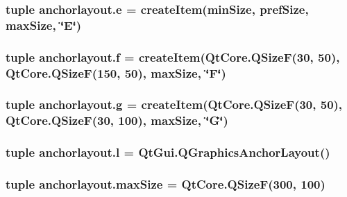 \subsubsection[{e}]{\setlength{\rightskip}{0pt plus 5cm}tuple anchorlayout.\+e = {\bf create\+Item}({\bf min\+Size}, {\bf pref\+Size}, {\bf max\+Size}, \char`\"{}E\char`\"{})}\label{namespaceanchorlayout_afef44353655532b8178bdd762c271458}
\hypertarget{namespaceanchorlayout_a8be1f6f388d4e72f30b16dc5140b952a}{}
\subsubsection[{f}]{\setlength{\rightskip}{0pt plus 5cm}tuple anchorlayout.\+f = {\bf create\+Item}(Qt\+Core.\+Q\+Size\+F(30, 50), Qt\+Core.\+Q\+Size\+F(150, 50), {\bf max\+Size}, \char`\"{}F\char`\"{})}\label{namespaceanchorlayout_a8be1f6f388d4e72f30b16dc5140b952a}
\hypertarget{namespaceanchorlayout_ae19906ece9806f7b2e1b1f3bc98d3ad5}{}
\subsubsection[{g}]{\setlength{\rightskip}{0pt plus 5cm}tuple anchorlayout.\+g = {\bf create\+Item}(Qt\+Core.\+Q\+Size\+F(30, 50), Qt\+Core.\+Q\+Size\+F(30, 100), {\bf max\+Size}, \char`\"{}G\char`\"{})}\label{namespaceanchorlayout_ae19906ece9806f7b2e1b1f3bc98d3ad5}
\hypertarget{namespaceanchorlayout_a8e1f9305cadfd9c24e23cb33c2ff6ea8}{}
\subsubsection[{l}]{\setlength{\rightskip}{0pt plus 5cm}tuple anchorlayout.\+l = Qt\+Gui.\+Q\+Graphics\+Anchor\+Layout()}\label{namespaceanchorlayout_a8e1f9305cadfd9c24e23cb33c2ff6ea8}
\hypertarget{namespaceanchorlayout_a7efb1ca849c45c75b6bd77bf8b08b870}{}
\subsubsection[{max\+Size}]{\setlength{\rightskip}{0pt plus 5cm}tuple anchorlayout.\+max\+Size = Qt\+Core.\+Q\+Size\+F(300, 100)}\label{namespaceanchorlayout_a7efb1ca849c45c75b6bd77bf8b08b870}
\hypertarget{namespaceanchorlayout_aeaf0c153482d3c7039fc82094bbdf5e0}{}
